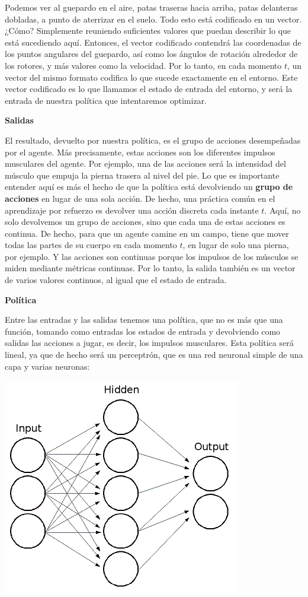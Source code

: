 \documentclass[
]{book}
\begin{document}
Podemos ver al guepardo en el aire, patas traseras hacia arriba, patas delanteras dobladas, a punto de aterrizar en el suelo. Todo esto está codificado en un vector. ¿Cómo? Simplemente reuniendo suficientes valores que puedan describir lo que está sucediendo aquí. Entonces, el vector codificado contendrá las coordenadas de los puntos angulares del guepardo, así como los ángulos de rotación alrededor de los rotores, y más valores como la velocidad. Por lo tanto, en cada momento \(t\), un vector del mismo formato codifica lo que sucede exactamente en el entorno. Este vector codificado es lo que llamamos el estado de entrada del entorno, y será la entrada de nuestra política que intentaremos optimizar.

\textbf{Salidas}

El resultado, devuelto por nuestra política, es el grupo de acciones desempeñadas por el agente. Más precisamente, estas acciones son los diferentes impulsos musculares del agente. Por ejemplo, una de las acciones será la intensidad del músculo que empuja la pierna trasera al nivel del pie. Lo que es importante entender aquí es más el hecho de que la política está devolviendo un \textbf{grupo de acciones} en lugar de una sola acción. De hecho, una práctica común en el aprendizaje por refuerzo es devolver una acción discreta cada instante \(t\). Aquí, no solo devolvemos un grupo de acciones, sino que cada una de estas acciones es continua. De hecho, para que un agente camine en un campo, tiene que mover todas las partes de su cuerpo en cada momento \(t\), en lugar de solo una pierna, por ejemplo. Y las acciones son continuas porque los impulsos de los músculos se miden mediante métricas continuas. Por lo tanto, la salida también es un vector de varios valores continuos, al igual que el estado de entrada.

\textbf{Política}

Entre las entradas y las salidas tenemos una política, que no es más que una función, tomando como entradas los estados de entrada y devolviendo como salidas las acciones a jugar, es decir, los impulsos musculares. Esta política será lineal, ya que de hecho será un perceptrón, que es una red neuronal simple de una capa y varias neuronas:

\includegraphics{Images/Perceptron.png}
\end{document}
